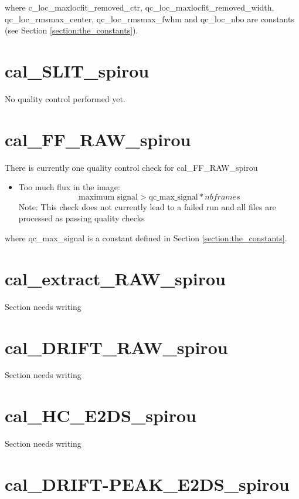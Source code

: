 \noindent where c\_loc\_maxlocfit\_removed\_ctr, qc\_loc\_maxlocfit\_removed\_width, qc\_loc\_rmsmax\_center, qc\_loc\_rmsmax\_fwhm and qc\_loc\_nbo are constants (see Section \ref{section:the_constants}).

\section{cal\_SLIT\_spirou}
\label{section:qc_cal_SLIT_spirou}

No quality control performed yet.

\section{cal\_FF\_RAW\_spirou}
\label{section:qc_cal_FF_RAW_spirou}

There is currently one quality control check for cal\_FF\_RAW\_spirou
\begin{itemize}
\item Too much flux in the image: 
	\begin{equation}
	\text{maximum signal} >\text{qc\_max\_signal} * nbframes
	\end{equation}
	\noindent Note: This check does not currently lead to a failed run and all files are processed as passing quality checks
\end{itemize}

\noindent where qc\_max\_signal is a constant defined in Section \ref{section:the_constants}.


\section{cal\_extract\_RAW\_spirou}
\label{section:qc_cal_extract_RAW_spirou}

Section needs writing

\section{cal\_DRIFT\_RAW\_spirou}
\label{section:qc_cal_DRIFT_RAW_spirou}

Section needs writing

\section{cal\_HC\_E2DS\_spirou}
\label{section:qc_cal_HC_E2DS_spirou}

Section needs writing

\section{cal\_DRIFT-PEAK\_E2DS\_spirou}
\label{section:qc_cal_DRIFT-PEAK_E2DS}

